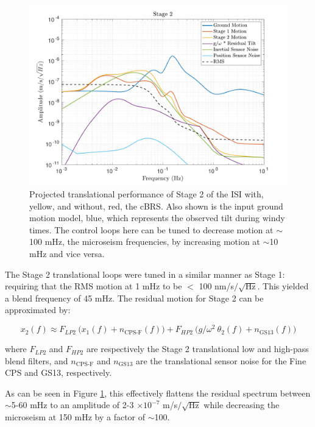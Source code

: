 \documentclass [12pt, proquest]{uwthesis}[2019]
\begin{document}
\begin{figure}[!h]
\begin{center}
\includegraphics[width=\textwidth]{cBRS_Model_ST2X.pdf}
\caption[Projected translational performance of Stage 2 of the ISI] {Projected translational performance of Stage 2 of the ISI with, yellow, and without, red, the cBRS. Also shown is the input ground motion model, blue, which represents the observed tilt during windy times. The control loops here can be tuned to decrease motion at $\sim$100 mHz, the microseism frequencies, by increasing motion at $\sim$10 mHz and vice versa.}
\label{cBRS2X}
\end{center}
\end{figure}
The Stage 2 translational loops were tuned in a similar manner as Stage 1: requiring that the RMS motion at 1 mHz to be $<$ 100 nm/s$/\sqrt{\text{Hz}}$. This yielded  a blend frequency of 45 mHz. The residual motion for Stage 2 can be approximated by:

\begin{equation}
x_2(f)\approx F_{LP2}\ \big(x_1(f)+n_\text{CPS-F}(f)\big)+F_{HP2}\ \big( g/\omega^2\ \theta_2(f) +n_\text{GS13}(f) \big)
\end{equation}

where $F_{LP2}$ and $F_{HP2}$ are respectively the Stage 2 translational low and high-pass blend filters, and $n_\text{CPS-F}$ and $n_\text{GS13}$ are the translational sensor noise for the Fine CPS and GS13, respectively.

As can be seen in Figure \ref{cBRS2X}, this effectively flattens the residual spectrum between $\sim$5-60 mHz to an amplitude of 2-3 $\times 10^{-7}$ m/s$/\sqrt{\text{Hz}}$ while decreasing the microseism at 150 mHz by a factor of $\sim$100.
\end{document}
